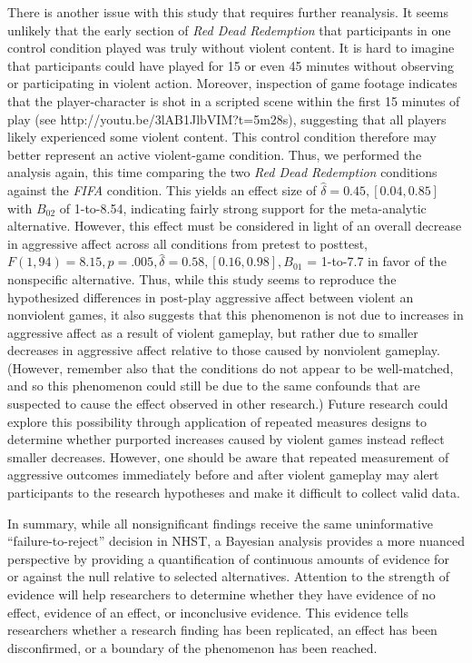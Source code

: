 \documentclass[man]{apa6}
\begin{document}
There is another issue with this study that requires further reanalysis. It seems unlikely that the early section of {\em Red Dead Redemption} that participants in one control condition played was truly without violent content. It is hard to imagine that participants could have played for 15 or even 45 minutes without observing or participating in violent action. Moreover, inspection of game footage indicates that the player-character is shot in a scripted scene within the first 15 minutes of play (see http://youtu.be/3lAB1JlbVIM?t=5m28s), suggesting that all players likely experienced some violent content. This control condition therefore may better represent an active violent-game condition.  Thus, we performed the analysis again, this time comparing the two {\em Red Dead Redemption} conditions against the {\em FIFA} condition. This yields an effect size of $\hat{\delta} = 0.45, [0.04, 0.85]$  with  $B_{02}$ of 1-to-8.54, indicating fairly strong support for the meta-analytic alternative. However, this effect must be considered in light of an overall decrease in aggressive affect across all conditions from pretest to posttest, $F(1, 94) = 8.15, p = .005, \hat{\delta} = 0.58, [0.16, 0.98], B_{01}$ = 1-to-7.7 in favor of the nonspecific alternative. Thus, while this study seems to reproduce the hypothesized differences in post-play aggressive affect between violent an nonviolent games, it also suggests that this phenomenon is not due to increases in aggressive affect as a result of violent gameplay, but rather due to smaller decreases in aggressive affect relative to those caused by nonviolent gameplay. (However, remember also that the conditions do not appear to be well-matched, and so this phenomenon could still be due to the same confounds that are suspected to cause the effect observed in other research.) Future research could explore this possibility through application of repeated measures designs to determine whether purported increases caused by violent games instead reflect smaller decreases. However, one should be aware that repeated measurement of aggressive outcomes immediately before and after violent gameplay may alert participants to the research hypotheses and make it difficult to collect valid data. 

In summary, while all nonsignificant findings receive the same uninformative ``failure-to-reject'' decision in NHST, a Bayesian analysis provides a more nuanced perspective by providing a quantification of continuous amounts of evidence for or against the null relative to selected alternatives. Attention to the strength of evidence will help researchers to determine whether they have evidence of no effect, evidence of an effect, or inconclusive evidence. This evidence tells researchers whether a research finding has been replicated, an effect has been disconfirmed, or a boundary of the phenomenon has been reached.
\end{document}
